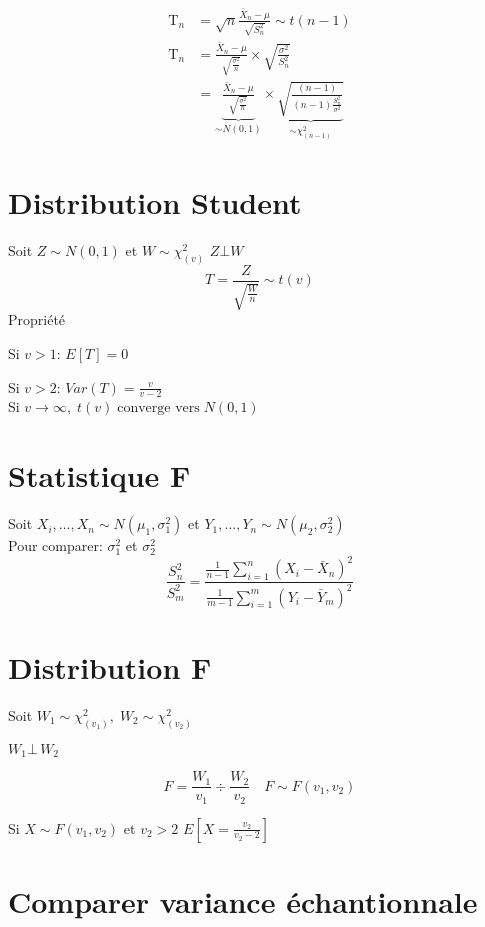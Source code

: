 \documentclass[]{book}
\theoremstyle{definition}
\theoremstyle{definition}
\theoremstyle{definition}
\theoremstyle{remark}
\begin{document}
\begin{align*}
    \text{T}_n& =\sqrt{n} \frac{\bar{X}_n -\mu}{\sqrt{S^2_n}}\sim t(n-1)\\
    \text{T}_n& =\frac{\bar{X}_n-\mu}{\sqrt{\frac{\sigma^2}{n}}}\times\sqrt{\frac{\sigma^2}{S^2_n}}\\
    & =\underbrace{\frac{\bar{X}_n-\mu}{\sqrt{\frac{\sigma^2}{n}}}}_{\sim N(0,1)}\times\underbrace{\sqrt{\frac{(n-1)}{(n-1)\frac{S^2_n}{\sigma^2}}}}_{\sim \chi_{(n-1)}^2}
\end{align*}

\section{Distribution Student}\label{distribution-student}

Soit \(Z\sim N(0,1)\) et \(W\sim \chi^2_{(v)}\) \(Z\bot W\) \[
T=\frac{Z}{\sqrt{\frac{W}{n}}}\sim t(v)
\] Propriété

Si \(v>1\): \(E[T]=0\)

Si \(v>2\): \(Var(T)=\frac{v}{v-2}\)\\
Si \(v\rightarrow \infty,\;t(v)\;\text{converge vers}\;N(0,1)\)

\section{Statistique F}\label{stats:stats:f}

Soit \(X_i,\dots,X_n\sim N(\mu_1,\sigma^2_1)\) et
\(Y_1,\dots,Y_n \sim N(\mu_2,\sigma_2^2)\)\\
Pour comparer: \(\sigma_1^2\) et \(\sigma^2_2\) \[
\frac{S_n^2}{S_m^2}=\frac{\frac{1}{n-1}\sum_{i=1}^n(X_i-\bar{X}_n)^2}{\frac{1}{m-1}\sum_{i=1}^m(Y_i-\bar{Y}_m)^2}
\]

\section{Distribution F}\label{stats:dist:f}

Soit \(W_1\sim\chi^2_{(v_1)},\;W_2\sim\chi^2_{(v_2)}\)

\(W_1 \bot\, W_2\)

\[
F=\dfrac{W_1}{v_1}\div\dfrac{W_2}{v_2}\quad
F\sim F(v_1,v_2)
\]

Si \(X \sim F(v_1,v_2)\) et \(v_2>2\)
\(E\left[X =\frac{v_2}{v_2-2}\right]\)

\section{Comparer variance
échantionnale}\label{stats:stats:f:varuxe9chan}
\end{document}
